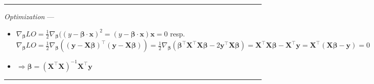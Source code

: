 {\color{lightgray}\hrule height 0.001mm}

\emph{Optimization} ---
\begin{itemize}
    \item $\nabla_{\boldsymbol{\beta}} LO = \frac{1}{2} \nabla_{\boldsymbol{\beta}} (( y - \boldsymbol{\beta} \cdot \boldsymbol{x})^2 = (y - \boldsymbol{\beta} \cdot \boldsymbol{x})\boldsymbol{x} = 0$
    resp.     
    $\nabla_{\boldsymbol{\beta}} LO = \frac{1}{2} \nabla_{\boldsymbol{\beta}} (( \boldsymbol{y} - \boldsymbol{X}\boldsymbol{\beta})^\intercal( \boldsymbol{y} - \boldsymbol{X}\boldsymbol{\beta} )) = \frac{1}{2} \nabla_{\boldsymbol{\beta}} (\boldsymbol{\beta}^\intercal \boldsymbol{X}^\intercal \boldsymbol{X} \boldsymbol{\beta} - 2 \boldsymbol{y}^\intercal \boldsymbol{X} \boldsymbol{\beta}) = \boldsymbol{X}^\intercal \boldsymbol{X} \boldsymbol{\beta} - \boldsymbol{X}^\intercal \boldsymbol{y} = \boldsymbol{X}^\intercal (\boldsymbol{X} \boldsymbol{\beta} - \boldsymbol{y}) = 0$
    \item $\Rightarrow \boldsymbol{\beta} = (\boldsymbol{X}^\intercal \boldsymbol{X})^{-1}  \boldsymbol{X}^\intercal \boldsymbol{y}$
\end{itemize}

{\color{lightgray}\hrule height 0.001mm}

